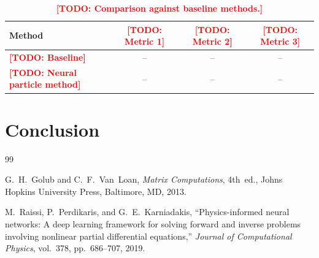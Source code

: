 \documentclass[11pt,a4paper]{article}
\newcommand{\inlinetodo}[1]{\textcolor{red}{\textbf{[TODO: #1]}}}
\theoremstyle{plain}
\theoremstyle{definition}
\theoremstyle{remark}
\begin{document}

\begin{table}[ht]
\centering
\caption{\inlinetodo{Comparison against baseline methods.}}\label{tab:results}
\begin{tabular}{lccc}
\toprule
Method & \inlinetodo{Metric 1} & \inlinetodo{Metric 2} & \inlinetodo{Metric 3} \\
\midrule
\inlinetodo{Baseline} & -- & -- & -- \\
\inlinetodo{Neural particle method} & -- & -- & -- \\
\bottomrule
\end{tabular}
\end{table}

\section{Conclusion}\label{sec:conclusion}


\begin{thebibliography}{99}

G.~H.~Golub and C.~F.~Van~Loan,
\textit{Matrix Computations},
4th~ed.,
Johns Hopkins University Press, Baltimore, MD, 2013.

M.~Raissi, P.~Perdikaris, and G.~E.~Karniadakis,
``Physics-informed neural networks: A deep learning framework for solving forward
and inverse problems involving nonlinear partial differential equations,''
\textit{Journal of Computational Physics},
vol.~378, pp.~686--707, 2019.

\end{thebibliography}
\end{document}
